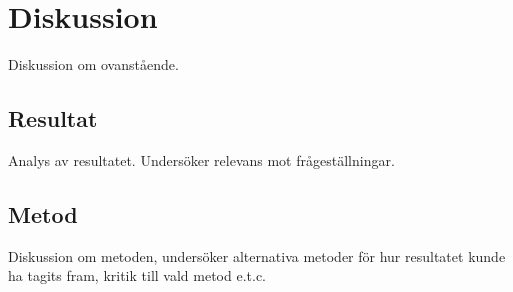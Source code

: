 \section{Diskussion}
\label{sec:alexander-discussion}

Diskussion om ovanstående.

\subsection{Resultat}
\label{subsec:alexander-discussion-results}

Analys av resultatet. Undersöker relevans mot frågeställningar.

\subsection{Metod}
\label{subsec:alexander-discussion-method}

Diskussion om metoden, undersöker alternativa metoder för hur resultatet kunde ha tagits fram, kritik till vald metod e.t.c.
